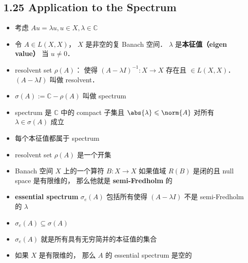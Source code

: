 \subsection{1.25 Application to the Spectrum}
\begin{itemize}
\item 考虑 $Au = \lambda u, u \in X, \lambda \in \mathbb C$

\item 令 $A\in L(X,X)$， $X$ 是非空的复 Banach 空间．  $\lambda$ 是\textbf{本征值（eigen value）} 当 $u\ne 0$．

\item resolvent set $\rho(A)$： 使得 $(A-\lambda I)^{-1}: X \to X$ 存在且 $\in L(X,X)$． $(A-\lambda I)$ 叫做 resolvent．

\item $\sigma(A) := \mathbb C - \rho(A)$ 叫做 spectrum

\item spectrum 是 $\mathbb C$ 中的 compact 子集且 $\abs{\lambda} \leqslant \norm{A}$ 对所有 $\lambda\in\sigma(A)$ 成立

\item 每个本征值都属于 spectrum

\item resolvent set $\rho(A)$ 是一个开集

\item Banach 空间 $X$ 上的一个算符 $B: X\to X$ 如果值域 $R(B)$ 是闭的且 null space 是有限维的， 那么他就是 \textbf{semi-Fredholm} 的

\item \textbf{essential spectrum} $\sigma_e(A)$ 包括所有使得 $(A - \lambda I)$ 不是 semi-Fredholm 的 $\lambda$
\item $\sigma_e(A) \subseteq \sigma(A)$
\item $\sigma_e(A)$ 就是所有具有无穷简并的本征值的集合
\item 如果 $X$ 是有限维的， 那么 $A$ 的 essential spectrum 是空的 
\end{itemize}

